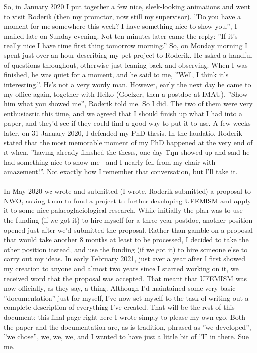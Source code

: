 \documentclass{article}
\begin{document}
So, in January 2020 I put together a few nice, sleek-looking animations and went to visit Roderik (then my promotor, now still my supervisor). ''Do you have a moment for me somewhere this week? I have something nice to show you.'', I mailed late on Sunday evening. Not ten minutes later came the reply: ''If it's really nice I have time first thing tomorrow morning.'' So, on Monday morning I spent just over an hour describing my pet project to Roderik. He asked a handful of questions throughout, otherwise just leaning back and observing. When I was finished, he was quiet for a moment, and he said to me, ''Well, I think it's interesting.''. He's not a very wordy man. However, early the next day he came to my office again, together with Heiko (Goelzer, then a postdoc at IMAU). ''Show him what you showed me'', Roderik told me. So I did. The two of them were very enthusiastic this time, and we agreed that I should finish up what I had into a paper, and they'd see if they could find a good way to put it to use. A few weeks later, on 31 January 2020, I defended my PhD thesis. In the laudatio, Roderik stated that the most memorable moment of my PhD happened at the very end of it when, ''having already finished the thesis, one day Tijn showed up and said he had something nice to show me - and I nearly fell from my chair with amazement!''. Not exactly how I remember that conversation, but I'll take it.\\
\\
In May 2020 we wrote and submitted (I wrote, Roderik submitted) a proposal to NWO, asking them to fund a project to further developing UFEMISM and apply it to some nice palaeoglaciological research. While initially the plan was to use the funding (if we got it) to hire myself for a three-year postdoc, another position opened just after we'd submitted the proposal. Rather than gamble on a proposal that would take another 8 months at least to be processed, I decided to take the other position instead, and use the funding (if we got it) to hire someone else to carry out my ideas. In early February 2021, just over a year after I first showed my creation to anyone and almost two years since I started working on it, we received word that the proposal was accepted. That meant that UFEMISM was now officially, as they say, a thing. Although I'd maintained some very basic ''documentation'' just for myself, I've now set myself to the task of writing out a complete description of everything I've created. That will be the rest of this document; this final page right here I wrote simply to please my own ego. Both the paper and the documentation are, as is tradition, phrased as ''we developed'', ''we chose'', we, we, we, and I wanted to have just a little bit of ''I'' in there. Sue me.
\end{document}
